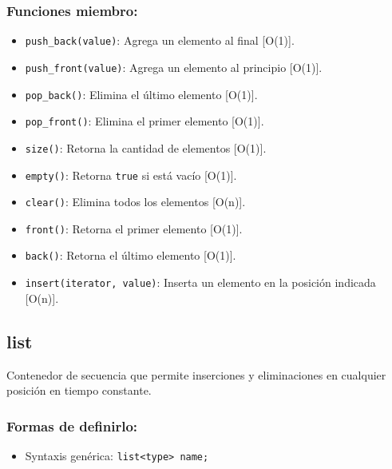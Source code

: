 \subsubsection{Funciones miembro:}
\begin{itemize}
  \item \texttt{push\_back(value)}: Agrega un elemento al final [O(1)].
  \item \texttt{push\_front(value)}: Agrega un elemento al principio [O(1)].
  \item \texttt{pop\_back()}: Elimina el último elemento [O(1)].
  \item \texttt{pop\_front()}: Elimina el primer elemento [O(1)].
  \item \texttt{size()}: Retorna la cantidad de elementos [O(1)].
  \item \texttt{empty()}: Retorna \texttt{true} si está vacío [O(1)].
  \item \texttt{clear()}: Elimina todos los elementos [O(n)].
  \item \texttt{front()}: Retorna el primer elemento [O(1)].
  \item \texttt{back()}: Retorna el último elemento [O(1)].
  \item \texttt{insert(iterator, value)}: Inserta un elemento en la posición indicada [O(n)]. 
\end{itemize}


\subsection{list}
\label{subsec:std_list}
Contenedor de secuencia que permite inserciones y eliminaciones en cualquier posición en tiempo constante. 

\subsubsection{Formas de definirlo:}
\begin{itemize}
  \item Syntaxis genérica: \texttt{list<type> name;}
\end{itemize}

